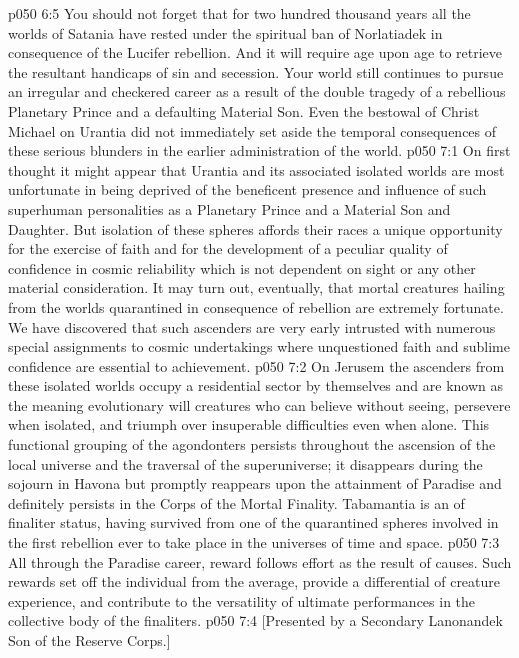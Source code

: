 \vs p050 6:5 \pc You should not forget that for two hundred thousand years all the worlds of Satania have rested under the spiritual ban of Norlatiadek in consequence of the Lucifer rebellion. And it will require age upon age to retrieve the resultant handicaps of sin and secession. Your world still continues to pursue an irregular and checkered career as a result of the double tragedy of a rebellious Planetary Prince and a defaulting Material Son. Even the bestowal of Christ Michael on Urantia did not immediately set aside the temporal consequences of these serious blunders in the earlier administration of the world.
\vs p050 7:1 On first thought it might appear that Urantia and its associated isolated worlds are most unfortunate in being deprived of the beneficent presence and influence of such superhuman personalities as a Planetary Prince and a Material Son and Daughter. But isolation of these spheres affords their races a unique opportunity for the exercise of faith and for the development of a peculiar quality of confidence in cosmic reliability which is not dependent on sight or any other material consideration. It may turn out, eventually, that mortal creatures hailing from the worlds quarantined in consequence of rebellion are extremely fortunate. We have discovered that such ascenders are very early intrusted with numerous special assignments to cosmic undertakings where unquestioned faith and sublime confidence are essential to achievement.
\vs p050 7:2 On Jerusem the ascenders from these isolated worlds occupy a residential sector by themselves and are known as the  meaning evolutionary will creatures who can believe without seeing, persevere when isolated, and triumph over insuperable difficulties even when alone. This functional grouping of the agondonters persists throughout the ascension of the local universe and the traversal of the superuniverse; it disappears during the sojourn in Havona but promptly reappears upon the attainment of Paradise and definitely persists in the Corps of the Mortal Finality. Tabamantia is an  of finaliter status, having survived from one of the quarantined spheres involved in the first rebellion ever to take place in the universes of time and space.
\vs p050 7:3 All through the Paradise career, reward follows effort as the result of causes. Such rewards set off the individual from the average, provide a differential of creature experience, and contribute to the versatility of ultimate performances in the collective body of the finaliters.
\vsetoff
\vs p050 7:4 [Presented by a Secondary Lanonandek Son of the Reserve Corps.]
